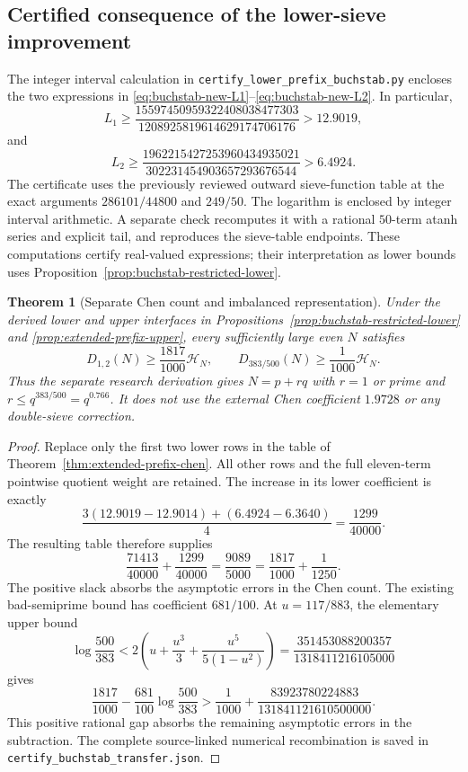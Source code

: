 \documentclass[11pt]{article}
\newtheorem{theorem}{Theorem}
\newcommand{\HN}{\mathcal H_N}
\begin{document}
\subsection{Certified consequence of the lower-sieve improvement}
\label{sec:buchstab-lower-corollary}

The integer interval calculation in
\texttt{certify\_lower\_prefix\_buchstab.py} encloses the two
expressions in \eqref{eq:buchstab-new-L1}--\eqref{eq:buchstab-new-L2}.
In particular,
\[
 L_1\ge
 \frac{15597450959322408038477303}{1208925819614629174706176}
 >12.9019,
\]
and
\[
 L_2\ge
 \frac{1962215427253960434935021}{302231454903657293676544}
 >6.4924.
\]
The certificate uses the previously reviewed outward sieve-function
table at the exact arguments $286101/44800$ and $249/50$.
The logarithm is enclosed by integer interval arithmetic.
A separate check recomputes it with a rational $50$-term
atanh series and explicit tail, and reproduces the sieve-table
endpoints. These computations certify real-valued expressions;
their interpretation as lower bounds uses
Proposition~\ref{prop:buchstab-restricted-lower}.

\begin{theorem}[Separate Chen count and imbalanced representation]
\label{thm:buchstab-lower-chen}
Under the derived lower and upper interfaces in
Propositions~\ref{prop:buchstab-restricted-lower} and
\ref{prop:extended-prefix-upper}, every sufficiently large even
$N$ satisfies
\[
 D_{1,2}(N)\ge\frac{1817}{1000}\HN,
 \qquad D_{383/500}(N)\ge\frac1{1000}\HN.
\]
Thus the separate research derivation gives
$N=p+rq$ with $r=1$ or prime and
$r\le q^{383/500}=q^{0.766}$.
It does not use the external Chen coefficient $1.9728$ or
any double-sieve correction.
\end{theorem}

\begin{proof}
Replace only the first two lower rows in the table of
Theorem~\ref{thm:extended-prefix-chen}. All other rows and
the full eleven-term pointwise quotient weight are retained.
The increase in its lower coefficient is exactly
\[
 \frac{3(12.9019-12.9014)+(6.4924-6.3640)}4
 =\frac{1299}{40000}.
\]
The resulting table therefore supplies
\[
 \frac{71413}{40000}+\frac{1299}{40000}
 =\frac{9089}{5000}
 =\frac{1817}{1000}+\frac1{1250}.
\]
The positive slack absorbs the asymptotic errors in the Chen
count. The existing bad-semiprime bound has coefficient
$681/100$. At $u=117/883$, the elementary upper bound
\[
 \log\frac{500}{383}
 <2\left(u+\frac{u^3}{3}+\frac{u^5}{5(1-u^2)}\right)
 =\frac{351453088200357}{1318411216105000}
\]
gives
\[
 \frac{1817}{1000}-\frac{681}{100}\log\frac{500}{383}
 >\frac1{1000}
  +\frac{83923780224883}{131841121610500000}.
\]
This positive rational gap absorbs the remaining asymptotic
errors in the subtraction. The complete source-linked numerical
recombination is saved in \texttt{certify\_buchstab\_transfer.json}.
\end{proof}
\end{document}
